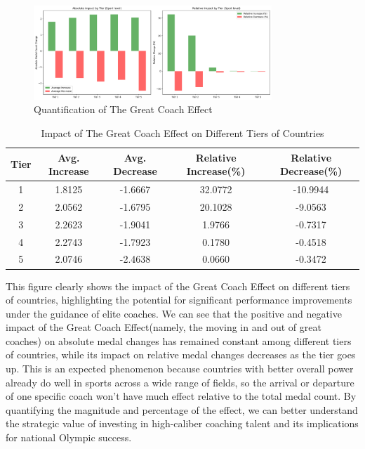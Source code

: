 \documentclass{mcmthesis}
\begin{document}
\begin{figure}[htbp]
    \centering
    \includegraphics[width=0.8\textwidth]{pics/coach_effect_impact_Sport_from_csv.png}
    \caption{Quantification of The Great Coach Effect}
\end{figure}

\begin{table}[htbp]
    \centering
    \begin{tabular}{|c|c|c|c|c|}
        \hline
        Tier & Avg. Increase & Avg. Decrease & Relative Increase(\%) & Relative Decrease(\%) \\
        \hline
        1 & 1.8125 & -1.6667 & 32.0772 & -10.9944 \\
        \hline
        2 & 2.0562 & -1.6795 & 20.1028 & -9.0563 \\
        \hline
        3 & 2.2623 & -1.9041 & 1.9766 & -0.7317 \\
        \hline
        4 & 2.2743 & -1.7923 & 0.1780 & -0.4518 \\
        \hline
        5 & 2.0746 & -2.4638 & 0.0660 & -0.3472 \\
        \hline
    \end{tabular}
    \caption{Impact of The Great Coach Effect on Different Tiers of Countries}
\end{table}

This figure clearly shows the impact of the Great Coach Effect on different tiers of countries, highlighting the potential for significant performance improvements under the guidance of elite coaches. We can see that the positive and negative impact of the Great Coach Effect(namely, the moving in and out of great coaches) on absolute medal changes has remained constant among different tiers of countries, while its impact on relative medal changes decreases as the tier goes up. This is an expected phenomenon because countries with better overall power already do well in sports across a wide range of fields, so the arrival or departure of one specific coach won't have much effect relative to the total medal count. By quantifying the magnitude and percentage of the effect, we can better understand the strategic value of investing in high-caliber coaching talent and its implications for national Olympic success.
\end{document}
